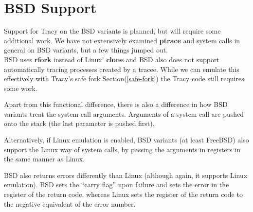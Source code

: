 \documentclass[a4paper, 10pt]{report}
\begin{document}
\section{BSD Support}
\label{bsd-support}

Support for Tracy on the BSD variants is planned, but will require some
additional work. We have not extensively examined \textbf{ptrace} and
system calls in general on BSD variants, but a few things jumped out. \\

BSD uses \textbf{rfork} instead of Linux' \textbf{clone} and BSD also does
not support automatically tracing processes created by a tracee. While
we can emulate this effectively with Tracy's safe fork
Section(\ref{safe-fork}) the Tracy code still requires some work.

Apart from this functional difference, there is also a difference in
how BSD variants treat the system call arguments. Arguments of a system
call are pushed onto the stack (the last parameter is pushed first).
\cite{int80h}

Alternatively, if Linux emulation is enabled, BSD variants (at least FreeBSD)
also support the Linux way of system calls, by passing the arguments in
registers in the same manner as Linux.

BSD also returns errors differently than Linux (although again, it supports
Linux emulation). BSD sets the ``carry flag'' upon failure and sets the error
in the register of the return code, whereas Linux sets the register of the
return code to the negative equivalent of the error number\cite{bsdasm}.




\end{document}
